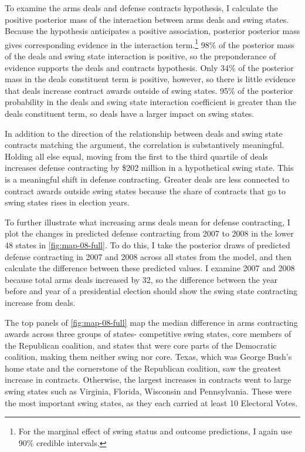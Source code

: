 \documentclass[12pt]{article}
\begin{document}
To examine the arms deals and defense contracts hypothesis, I calculate the positive posterior mass of the interaction between arms deals and swing states. Because the hypothesis anticipates a positive association, posterior posterior mass gives corresponding evidence in the interaction term.\footnote{For the marginal effect of swing status and outcome predictions, I again use 90\% credible intervals.}
98\% of the posterior mass of the deals and swing state interaction is positive, so the preponderance of evidence supports the deals and contracts hypothesis.
Only 34\% of the posterior mass in the deals constituent term is positive, however, so there is little evidence that deals increase contract awards outside of swing states.
95\% of the posterior probability in the deals and swing state interaction coefficient is greater than the deals constituent term, so deals have a larger impact on swing states. 


In addition to the direction of the relationship between deals and swing state contracts matching the argument, the correlation is substantively meaningful. 
Holding all else equal, moving from the first to the third quartile of deals increases defense contracting by \$202 million in a hypothetical swing state. 
This is a meaningful shift in defense contracting. 
Greater deals are less connected to contract awards outside swing states because the share of contracts that go to swing states rises in election years.


To further illustrate what increasing arms deals mean for defense contracting, I plot the changes in predicted defense contracting from 2007 to 2008 in the lower 48 states in \autoref{fig:map-08-full}. 
To do this, I take the posterior draws of predicted defense contracting in 2007 and 2008 across all states from the model, and then calculate the difference between these predicted values. 
I examine 2007 and 2008 because total arms deals increased by 32, so the difference between the year before and year of a presidential election should show the swing state contracting increase from deals. 


The top panels of \autoref{fig:map-08-full} map the median difference in arms contracting awards across three groups of states- competitive swing states, core members of the Republican coalition, and states that were core parts of the Democratic coalition, making them neither swing nor core. 
Texas, which was George Bush's home state and the cornerstone of the Republican coalition, saw the greatest increase in contracts.
Otherwise, the largest increases in contracts went to large swing states such as Virginia, Florida, Wisconsin and Pennsylvania. 
These were the most important swing states, as they each carried at least 10 Electoral Votes. 
\end{document}
